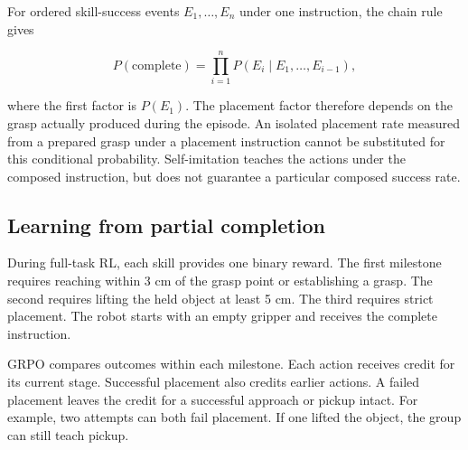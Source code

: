 For ordered skill-success events $E_1,\ldots,E_n$ under one instruction, the chain rule gives

\begin{equation}
P(\mathrm{complete})=\prod_{i=1}^{n}P(E_i\mid E_1,\ldots,E_{i-1}),
\label{eq:chain}
\end{equation}

where the first factor is $P(E_1)$. The placement factor therefore depends on the grasp actually produced during the episode. An isolated placement rate measured from a prepared grasp under a placement instruction cannot be substituted for this conditional probability. Self-imitation teaches the actions under the composed instruction, but does not guarantee a particular composed success rate.

\subsection{Learning from partial completion}\label{sec:milestones}
During full-task RL, each skill provides one binary reward. The first milestone requires reaching within 3 cm of the grasp point or establishing a grasp. The second requires lifting the held object at least 5 cm. The third requires strict placement. The robot starts with an empty gripper and receives the complete instruction.

GRPO compares outcomes within each milestone. Each action receives credit for its current stage. Successful placement also credits earlier actions. A failed placement leaves the credit for a successful approach or pickup intact. For example, two attempts can both fail placement. If one lifted the object, the group can still teach pickup.


